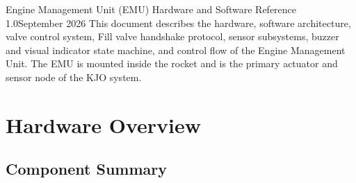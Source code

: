 ﻿\documentclass[11pt,letterpaper]{article}
\newcommand{\docversion}{1.0}
\newcommand{\docdate}{September 2026}
\begin{document}


\KJOtitlepage%
  {Engine Management Unit (EMU)}%
  {Hardware and Software Reference}%
  {\docversion}{\docdate}%
  {This document describes the hardware, software architecture, valve control
   system, Fill valve handshake protocol, sensor subsystems, buzzer and visual
   indicator state machine, and control flow of the Engine Management Unit.
   The EMU is mounted inside the rocket and is the primary actuator and
   sensor node of the KJO system.}

\tableofcontents\newpage

\section{Hardware Overview}

\subsection{Component Summary}
\end{document}
